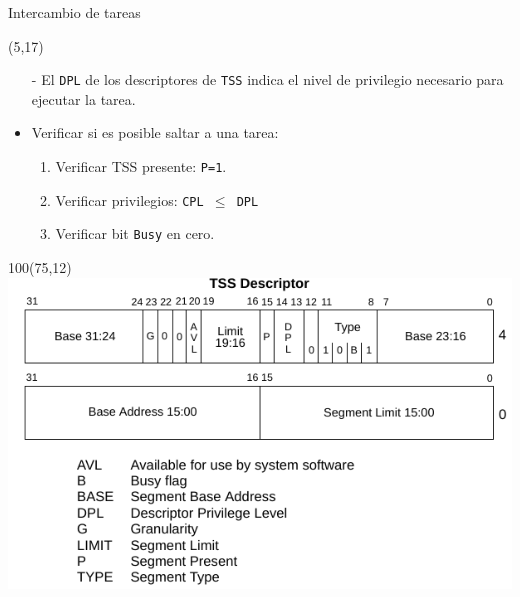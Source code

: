 \documentclass[aspectratio=169]{beamer}
\begin{document}
\begin{frame}{Intercambio de tareas}
    \begin{textblock}{65}(5,17)
        \begin{itemize}
        \setlength\itemsep{0.3cm}
        \small
        \item[-] El \texttt{DPL} de los descriptores de \texttt{TSS} indica el nivel de privilegio necesario para ejecutar la tarea.
        \item<2->[-] Verificar si es posible saltar a una tarea:
        \vspace{0.2cm}
        \begin{enumerate}
        \small
        \setlength\itemsep{0.2cm}
        \item<3->[1.] Verificar TSS presente: \texttt{P=1}.
        \item<4->[2.] Verificar privilegios: \texttt{CPL $\leq$ DPL}
        \item<5->[3.] Verificar bit \texttt{Busy} en cero.
        \end{enumerate}
        \end{itemize}
        \vspace{0.5cm}
    \end{textblock}
    \begin{textblock}{100}(75,12)
        \includegraphics[scale=0.8]{img/TSSdescriptor.pdf}
    \end{textblock}
\end{frame}
\end{document}
